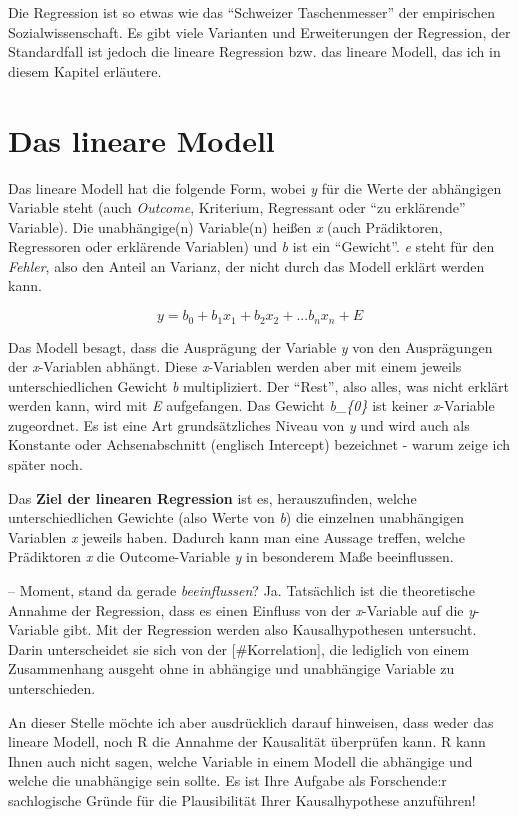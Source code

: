 \documentclass[
]{book}
\begin{document}
Die Regression ist so etwas wie das ``Schweizer Taschenmesser'' der empirischen Sozialwissenschaft. Es gibt viele Varianten und Erweiterungen der Regression, der Standardfall ist jedoch die lineare Regression bzw. das lineare Modell, das ich in diesem Kapitel erläutere.

\hypertarget{das-lineare-modell}{%
\section{Das lineare Modell}\label{das-lineare-modell}}

Das lineare Modell hat die folgende Form, wobei \emph{y} für die Werte der abhängigen Variable steht (auch \emph{Outcome}, Kriterium, Regressant oder ``zu erklärende'' Variable). Die unabhängige(n) Variable(n) heißen \emph{x} (auch Prädiktoren, Regressoren oder erklärende Variablen) und \emph{b} ist ein ``Gewicht''. \emph{e} steht für den \emph{Fehler}, also den Anteil an Varianz, der nicht durch das Modell erklärt werden kann.

\[y = b_{0}+b_{1}x_{1}+b_{2}x_{2}+... b_{n}x_{n}+E\]

Das Modell besagt, dass die Ausprägung der Variable \emph{y} von den Ausprägungen der \emph{x}-Variablen abhängt. Diese \emph{x}-Variablen werden aber mit einem jeweils unterschiedlichen Gewicht \emph{b} multipliziert. Der ``Rest'', also alles, was nicht erklärt werden kann, wird mit \emph{E} aufgefangen. Das Gewicht \emph{b\_\{0\}} ist keiner \emph{x}-Variable zugeordnet. Es ist eine Art grundsätzliches Niveau von \emph{y} und wird auch als Konstante oder Achsenabschnitt (englisch Intercept) bezeichnet - warum zeige ich später noch.

Das \textbf{Ziel der linearen Regression} ist es, herauszufinden, welche unterschiedlichen Gewichte (also Werte von \emph{b}) die einzelnen unabhängigen Variablen \emph{x} jeweils haben. Dadurch kann man eine Aussage treffen, welche Prädiktoren \emph{x} die Outcome-Variable \emph{y} in besonderem Maße beeinflussen.

-- Moment, stand da gerade \emph{beeinflussen}? Ja. Tatsächlich ist die theoretische Annahme der Regression, dass es einen Einfluss von der \emph{x}-Variable auf die \emph{y}-Variable gibt. Mit der Regression werden also Kausalhypothesen untersucht. Darin unterscheidet sie sich von der {[}\#Korrelation{]}, die lediglich von einem Zusammenhang ausgeht ohne in abhängige und unabhängige Variable zu unterschieden.

An dieser Stelle möchte ich aber ausdrücklich darauf hinweisen, dass weder das lineare Modell, noch R die Annahme der Kausalität überprüfen kann. R kann Ihnen auch nicht sagen, welche Variable in einem Modell die abhängige und welche die unabhängige sein sollte. Es ist Ihre Aufgabe als Forschende:r sachlogische Gründe für die Plausibilität Ihrer Kausalhypothese anzuführen!
\end{document}
